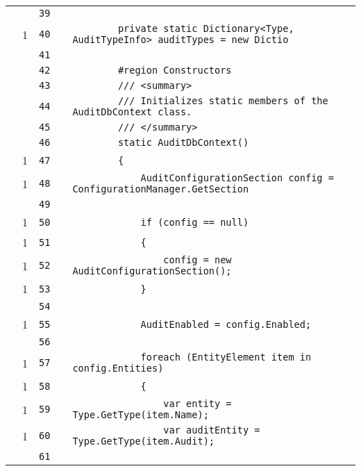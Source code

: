 \documentclass[a4paper,10pt]{article}
\begin{document}
\begin{longtable}[l]{lrrll}
\cellcolor{gray} &  & \verb~39~ & & \verb~~\\
\cellcolor{green} & 1 & \verb~40~ & & \verb~        private static Dictionary<Type, AuditTypeInfo> auditTypes = new Dictio~\\
\cellcolor{gray} &  & \verb~41~ & & \verb~~\\
\cellcolor{gray} &  & \verb~42~ & & \verb~        #region Constructors~\\
\cellcolor{gray} &  & \verb~43~ & & \verb~        /// <summary>~\\
\cellcolor{gray} &  & \verb~44~ & & \verb~        /// Initializes static members of the AuditDbContext class.~\\
\cellcolor{gray} &  & \verb~45~ & & \verb~        /// </summary>~\\
\cellcolor{gray} &  & \verb~46~ & & \verb~        static AuditDbContext()~\\
\cellcolor{green} & 1 & \verb~47~ & & \verb~        {~\\
\cellcolor{green} & 1 & \verb~48~ & & \verb~            AuditConfigurationSection config = ConfigurationManager.GetSection~\\
\cellcolor{gray} &  & \verb~49~ & & \verb~~\\
\cellcolor{green} & 1 & \verb~50~ & & \verb~            if (config == null)~\\
\cellcolor{green} & 1 & \verb~51~ & & \verb~            {~\\
\cellcolor{green} & 1 & \verb~52~ & & \verb~                config = new AuditConfigurationSection();~\\
\cellcolor{green} & 1 & \verb~53~ & & \verb~            }~\\
\cellcolor{gray} &  & \verb~54~ & & \verb~~\\
\cellcolor{green} & 1 & \verb~55~ & & \verb~            AuditEnabled = config.Enabled;~\\
\cellcolor{gray} &  & \verb~56~ & & \verb~~\\
\cellcolor{green} & 1 & \verb~57~ & & \verb~            foreach (EntityElement item in config.Entities)~\\
\cellcolor{green} & 1 & \verb~58~ & & \verb~            {~\\
\cellcolor{green} & 1 & \verb~59~ & & \verb~                var entity = Type.GetType(item.Name);~\\
\cellcolor{green} & 1 & \verb~60~ & & \verb~                var auditEntity = Type.GetType(item.Audit);~\\
\cellcolor{gray} &  & \verb~61~ & & \verb~~\\

\end{longtable}
\end{document}
